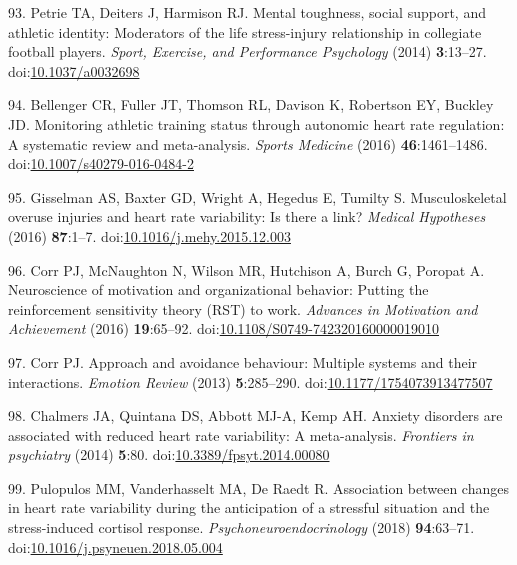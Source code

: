 \documentclass[
  english,
  man]{apa6}
\newenvironment{cslreferences}%
  {}%
  {\par}
\begin{document}
\begin{cslreferences}
\leavevmode\hypertarget{ref-Petrie2014}{}%
93. Petrie TA, Deiters J, Harmison RJ. Mental toughness, social support, and athletic identity: Moderators of the life stress-injury relationship in collegiate football players. \emph{Sport, Exercise, and Performance Psychology} (2014) \textbf{3}:13--27. doi:\href{https://doi.org/10.1037/a0032698}{10.1037/a0032698}

\leavevmode\hypertarget{ref-Bellenger2016}{}%
94. Bellenger CR, Fuller JT, Thomson RL, Davison K, Robertson EY, Buckley JD. Monitoring athletic training status through autonomic heart rate regulation: A systematic review and meta-analysis. \emph{Sports Medicine} (2016) \textbf{46}:1461--1486. doi:\href{https://doi.org/10.1007/s40279-016-0484-2}{10.1007/s40279-016-0484-2}

\leavevmode\hypertarget{ref-Gisselman2016}{}%
95. Gisselman AS, Baxter GD, Wright A, Hegedus E, Tumilty S. Musculoskeletal overuse injuries and heart rate variability: Is there a link? \emph{Medical Hypotheses} (2016) \textbf{87}:1--7. doi:\href{https://doi.org/10.1016/j.mehy.2015.12.003}{10.1016/j.mehy.2015.12.003}

\leavevmode\hypertarget{ref-Corr2016b}{}%
96. Corr PJ, McNaughton N, Wilson MR, Hutchison A, Burch G, Poropat A. Neuroscience of motivation and organizational behavior: Putting the reinforcement sensitivity theory (RST) to work. \emph{Advances in Motivation and Achievement} (2016) \textbf{19}:65--92. doi:\href{https://doi.org/10.1108/S0749-742320160000019010}{10.1108/S0749-742320160000019010}

\leavevmode\hypertarget{ref-Corr2013}{}%
97. Corr PJ. Approach and avoidance behaviour: Multiple systems and their interactions. \emph{Emotion Review} (2013) \textbf{5}:285--290. doi:\href{https://doi.org/10.1177/1754073913477507}{10.1177/1754073913477507}

\leavevmode\hypertarget{ref-Chalmers2014}{}%
98. Chalmers JA, Quintana DS, Abbott MJ-A, Kemp AH. Anxiety disorders are associated with reduced heart rate variability: A meta-analysis. \emph{Frontiers in psychiatry} (2014) \textbf{5}:80. doi:\href{https://doi.org/10.3389/fpsyt.2014.00080}{10.3389/fpsyt.2014.00080}

\leavevmode\hypertarget{ref-Pulopulos2018}{}%
99. Pulopulos MM, Vanderhasselt MA, De Raedt R. Association between changes in heart rate variability during the anticipation of a stressful situation and the stress-induced cortisol response. \emph{Psychoneuroendocrinology} (2018) \textbf{94}:63--71. doi:\href{https://doi.org/10.1016/j.psyneuen.2018.05.004}{10.1016/j.psyneuen.2018.05.004}


\end{cslreferences}
\end{document}
